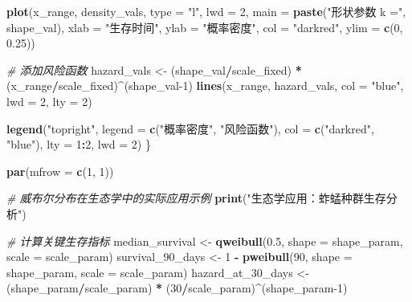 \documentclass[
  twoside]{book}
\newenvironment{Shaded}{\begin{snugshade}}{\end{snugshade}}
\newcommand{\AttributeTok}[1]{\textcolor[rgb]{0.13,0.29,0.53}{#1}}
\newcommand{\CommentTok}[1]{\textcolor[rgb]{0.56,0.35,0.01}{\textit{#1}}}
\newcommand{\DecValTok}[1]{\textcolor[rgb]{0.00,0.00,0.81}{#1}}
\newcommand{\FloatTok}[1]{\textcolor[rgb]{0.00,0.00,0.81}{#1}}
\newcommand{\FunctionTok}[1]{\textcolor[rgb]{0.13,0.29,0.53}{\textbf{#1}}}
\newcommand{\NormalTok}[1]{#1}
\newcommand{\OtherTok}[1]{\textcolor[rgb]{0.56,0.35,0.01}{#1}}
\newcommand{\SpecialCharTok}[1]{\textcolor[rgb]{0.81,0.36,0.00}{\textbf{#1}}}
\newcommand{\StringTok}[1]{\textcolor[rgb]{0.31,0.60,0.02}{#1}}
\begin{document}
\begin{Shaded}
\begin{Highlighting}[]
  \FunctionTok{plot}\NormalTok{(x\_range, density\_vals, }\AttributeTok{type =} \StringTok{"l"}\NormalTok{, }\AttributeTok{lwd =} \DecValTok{2}\NormalTok{,}
       \AttributeTok{main =} \FunctionTok{paste}\NormalTok{(}\StringTok{"形状参数 k ="}\NormalTok{, shape\_val),}
       \AttributeTok{xlab =} \StringTok{"生存时间"}\NormalTok{, }\AttributeTok{ylab =} \StringTok{"概率密度"}\NormalTok{,}
       \AttributeTok{col =} \StringTok{"darkred"}\NormalTok{, }\AttributeTok{ylim =} \FunctionTok{c}\NormalTok{(}\DecValTok{0}\NormalTok{, }\FloatTok{0.25}\NormalTok{))}

  \CommentTok{\# 添加风险函数}
\NormalTok{  hazard\_vals }\OtherTok{\textless{}{-}}\NormalTok{ (shape\_val}\SpecialCharTok{/}\NormalTok{scale\_fixed) }\SpecialCharTok{*}\NormalTok{ (x\_range}\SpecialCharTok{/}\NormalTok{scale\_fixed)}\SpecialCharTok{\^{}}\NormalTok{(shape\_val}\DecValTok{{-}1}\NormalTok{)}
  \FunctionTok{lines}\NormalTok{(x\_range, hazard\_vals, }\AttributeTok{col =} \StringTok{"blue"}\NormalTok{, }\AttributeTok{lwd =} \DecValTok{2}\NormalTok{, }\AttributeTok{lty =} \DecValTok{2}\NormalTok{)}

  \FunctionTok{legend}\NormalTok{(}\StringTok{"topright"}\NormalTok{, }\AttributeTok{legend =} \FunctionTok{c}\NormalTok{(}\StringTok{"概率密度"}\NormalTok{, }\StringTok{"风险函数"}\NormalTok{),}
         \AttributeTok{col =} \FunctionTok{c}\NormalTok{(}\StringTok{"darkred"}\NormalTok{, }\StringTok{"blue"}\NormalTok{), }\AttributeTok{lty =} \DecValTok{1}\SpecialCharTok{:}\DecValTok{2}\NormalTok{, }\AttributeTok{lwd =} \DecValTok{2}\NormalTok{)}
\NormalTok{\}}

\FunctionTok{par}\NormalTok{(}\AttributeTok{mfrow =} \FunctionTok{c}\NormalTok{(}\DecValTok{1}\NormalTok{, }\DecValTok{1}\NormalTok{))}

\CommentTok{\# 威布尔分布在生态学中的实际应用示例}
\FunctionTok{print}\NormalTok{(}\StringTok{"生态学应用：蚱蜢种群生存分析"}\NormalTok{)}

\CommentTok{\# 计算关键生存指标}
\NormalTok{median\_survival }\OtherTok{\textless{}{-}} \FunctionTok{qweibull}\NormalTok{(}\FloatTok{0.5}\NormalTok{, }\AttributeTok{shape =}\NormalTok{ shape\_param, }\AttributeTok{scale =}\NormalTok{ scale\_param)}
\NormalTok{survival\_90\_days }\OtherTok{\textless{}{-}} \DecValTok{1} \SpecialCharTok{{-}} \FunctionTok{pweibull}\NormalTok{(}\DecValTok{90}\NormalTok{, }\AttributeTok{shape =}\NormalTok{ shape\_param, }\AttributeTok{scale =}\NormalTok{ scale\_param)}
\NormalTok{hazard\_at\_30\_days }\OtherTok{\textless{}{-}}\NormalTok{ (shape\_param}\SpecialCharTok{/}\NormalTok{scale\_param) }\SpecialCharTok{*}\NormalTok{ (}\DecValTok{30}\SpecialCharTok{/}\NormalTok{scale\_param)}\SpecialCharTok{\^{}}\NormalTok{(shape\_param}\DecValTok{{-}1}\NormalTok{)}


\end{Highlighting}
\end{Shaded}
\end{document}
